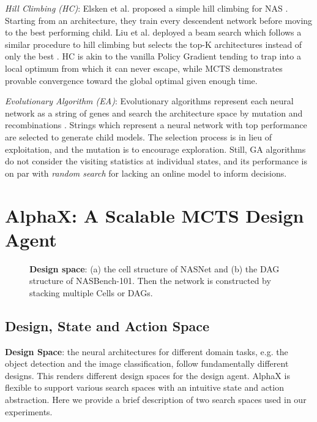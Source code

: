 \documentclass[10pt,twocolumn,letterpaper]{article}
\begin{document}
\textit{Hill Climbing (HC)}: Elsken et al. proposed a simple hill climbing for NAS \cite{elsken2017simple}. Starting from an architecture, they train every descendent network before moving to the best performing child. Liu et al. deployed a beam search which follows a similar procedure to hill climbing but selects the top-K architectures instead of only the best \cite{liu2017progressive}.
HC is akin to the vanilla Policy Gradient tending to trap into a local optimum from which it can never escape, while MCTS demonstrates provable convergence toward the global optimal given enough time\cite{kocsis2006bandit}.


\textit{Evolutionary Algorithm (EA)}: Evolutionary algorithms represent each neural network as a string of genes and search the architecture space by mutation and recombinations \cite{miller1989designing,Stanley2002,stanley2007compositional,jozefowicz2015empirical,fernando2016convolution,Liu2017a,Real2017,xie2017genetic,miikkulainen2017evolving,Suganuma2017,real2018regularized}.
Strings which represent a neural network with top performance are selected to generate child models. The selection process is in lieu of exploitation, and the mutation is to encourage exploration. Still, GA algorithms do not consider the visiting statistics at individual states, and its performance is on par with \textit{random search} for lacking an online model to inform decisions.

\section{AlphaX: A Scalable MCTS Design Agent}

\begin{figure}[t]
\centering 
{} \quad
{}  \quad
\caption{ \textbf{Design space}: (a) the cell structure of NASNet and (b) the DAG structure of NASBench-101. Then the network is constructed by stacking multiple Cells or DAGs. }
\label{nonlinear_connections}
\end{figure}

\subsection{Design, State and Action Space}
\label{content:design_space}
\textbf{Design Space}: the neural architectures for different domain tasks, e.g. the object detection and the image classification, follow fundamentally different designs. This renders different design spaces for the design agent. AlphaX is flexible to support various search spaces with an intuitive state and action abstraction. Here we provide a brief description of two search spaces used in our experiments.  
\end{document}
